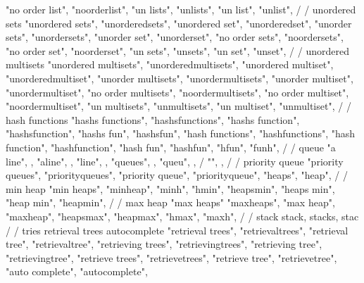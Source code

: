{{{{{{{{{        "no order list", 
        "noorderlist", 
        "un lists", 
        "unlists", 
        "un list", 
        "unlist", 
        /
        / unordered sets
        "unordered sets", 
        "unorderedsets", 
        "unordered set", 
        "unorderedset", 
        "unorder sets", 
        "unordersets", 
        "unorder set", 
        "unorderset", 
        "no order sets", 
        "noordersets", 
        "no order set", 
        "noorderset", 
        "un sets", 
        "unsets", 
        "un set", 
        "unset", 
        /
        / unordered multisets
        "unordered multisets", 
        "unorderedmultisets", 
        "unordered multiset", 
        "unorderedmultiset", 
        "unorder multisets", 
        "unordermultisets", 
        "unorder multiset", 
        "unordermultiset", 
        "no order multisets", 
        "noordermultisets", 
        "no order multiset", 
        "noordermultiset", 
        "un multisets", 
        "unmultisets", 
        "un multiset", 
        "unmultiset", 
        /
        / hash functions
        "hashs functions",  
        "hashsfunctions",  
        "hashs function",  
        "hashsfunction",  
        "hashs fun",  
        "hashsfun",  
        "hash functions",  
        "hashfunctions",  
        "hash function",  
        "hashfunction",  
        "hash fun",  
        "hashfun",  
        "hfun",  
        "funh",  
        /
        / queue 
        "a line", , 
        "aline", , 
        "line", , 
        "queues", , 
        "queu", , 
        / {"", ,
        /
        / priority queue 
        "priority queues",  
        "priorityqueues",  
        "priority queue",  
        "priorityqueue",  
        "heaps",  
        "heap",  
        /
        / min heap 
        "min heaps",
        "minheap", 
        "minh", 
        "hmin",
        "heapsmin",
        "heaps min",
        "heap min",
        "heapmin",
        /
        / max heap
        "max heaps"
        "maxheaps",
        "max heap",
        "maxheap", 
        "heapsmax",
        "heapmax", 
        "hmax",
        "maxh",
        /
        / stack
        stack, stacks, stac
        /
        / tries retrieval trees autocomplete 
        "retrieval trees",  
        "retrievaltrees",  
        "retrieval tree",  
        "retrievaltree",  
        "retrieving trees",  
        "retrievingtrees",  
        "retrieving tree",  
        "retrievingtree",  
        "retrieve trees",  
        "retrievetrees",  
        "retrieve tree",  
        "retrievetree",  
        "auto complete",  
        "autocomplete",  
}}}}}}}}}}
